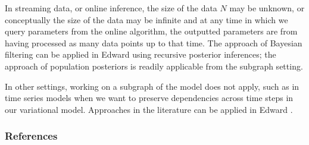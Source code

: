 In streaming data, or online inference, the size of the data $N$
may be unknown, or conceptually the size of the data may be
infinite and at any time in which we query parameters from the online
algorithm, the outputted parameters are from having processed as many
data points up to that time.
The approach of Bayesian filtering
\citep{doucet2000on,broderick2013streaming} can be applied in Edward using
recursive posterior inferences; the approach of population posteriors
\citep{mcinerney2015population} is readily applicable from the subgraph
setting.

In other settings, working on a subgraph of the model does not
apply, such as in time series models when we want to
preserve dependencies across time steps in our variational model.
Approaches in the literature can be applied in Edward
\citep{binder1997space,johnson2014stochastic,foti2014stochastic}.

\subsubsection{References}\label{references}
